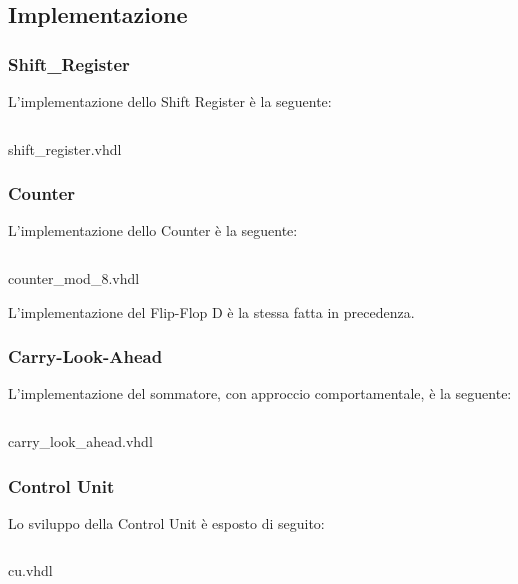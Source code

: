 \subsection{Implementazione}
\subsubsection{Shift\_Register}
L'implementazione dello Shift Register è la seguente:
 \begin{code}
    \inputminted[frame=lines, framesep=2mm, baselinestretch=1.2, bgcolor=LightGray, fontsize=\footnotesize, linenos]{vhdl}{vhdl_files/Esercizio_7_1/shift_register.vhdl}
    \caption{shift\_register.vhdl}
    \label{lbl:shr}
\end{code}

\subsubsection{Counter}
L'implementazione dello Counter è la seguente:
 \begin{code}
    \inputminted[frame=lines, framesep=2mm, baselinestretch=1.2, bgcolor=LightGray, fontsize=\footnotesize, linenos]{vhdl}{vhdl_files/Esercizio_7_1/counter_mod_8.vhdl}
    \caption{counter\_mod\_8.vhdl}
    \label{lbl:cnt_mod_8}
\end{code}

L'implementazione del Flip-Flop D è la stessa fatta in precedenza. %


\subsubsection{Carry-Look-Ahead}
L'implementazione del sommatore, con approccio comportamentale, è la seguente:
 \begin{code}
    \inputminted[frame=lines, framesep=2mm, baselinestretch=1.2, bgcolor=LightGray, fontsize=\footnotesize, linenos]{vhdl}{vhdl_files/Esercizio_7_1/carry_look_ahead.vhdl}
    \caption{carry\_look\_ahead.vhdl}
    \label{lbl:cla}
\end{code}

\subsubsection{Control Unit}
Lo sviluppo della Control Unit è esposto di seguito:
 \begin{code}
    \inputminted[frame=lines, framesep=2mm, baselinestretch=1.2, bgcolor=LightGray, fontsize=\footnotesize, linenos]{vhdl}{vhdl_files/Esercizio_7_1/cu.vhdl}
    \caption{cu.vhdl}
    \label{lbl:cu_booth}
\end{code}

